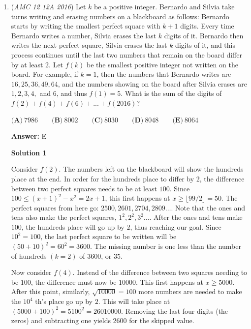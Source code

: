 \begin{enumerate}
 Since $a$ is positive so is R.

 This means that $r_1 = r_2 = r_3 = \sqrt{3}$

 From here you get find that $b=9$

 - AMBRIGGS

 


	\item (\textit{AMC 12 12A 2016}) Let $k$ be a positive integer. Bernardo and Silvia take turns writing and erasing numbers on a blackboard as follows: Bernardo starts by writing the smallest perfect square with $k+1$ digits. Every time Bernardo writes a number, Silvia erases the last $k$ digits of it. Bernardo then writes the next perfect square, Silvia erases the last $k$ digits of it, and this process continues until the last two numbers that remain on the board differ by at least 2. Let $f(k)$ be the smallest positive integer not written on the board. For example, if $k = 1$, then the numbers that Bernardo writes are $16, 25, 36, 49, 64$, and the numbers showing on the board after Silvia erases are $1, 2, 3, 4,$ and $6$, and thus $f(1) = 5$. What is the sum of the digits of $f(2) + f(4)+ f(6) + ... + f(2016)$?


 $\textbf{(A)}\ 7986\qquad\textbf{(B)}\ 8002\qquad\textbf{(C)}\ 8030\qquad\textbf{(D)}\ 8048\qquad\textbf{(E)}\ 8064$

 \textbf{Answer: }E



\textbf{Solution 1}

Consider $f(2)$. The numbers left on the blackboard will show the hundreds place at the end. In order for the hundreds place to differ by 2, the difference between two perfect squares needs to be at least $100$. Since $100\le (x+1)^2-x^2=2x+1$, this first happens at $x\ge \lfloor 99/2\rfloor = 50$. The perfect squares from here go: $2500,  2601, 2704, 2809\dots$. Note that the ones and tens also make the perfect squares, $1^2,2^2,3^2\dots$. After the ones and tens make $100$, the hundreds place will go up by $2$, thus reaching our goal. Since $10^2=100$, the last perfect square to be written will be $\left(50+10\right)^2=60^2=3600$. The missing number is one less than the number of hundreds $(k=2)$ of $3600$, or $35$.

 Now consider $f(4)$. Instead of the difference between two squares needing to be $100$, the difference must now be $10000$. This first happens at $x\ge 5000$. After this point, similarly, $\sqrt{10000}=100$ more numbers are needed to make the $10^4$ th's place go up by $2$. This will take place at $\left(5000+100\right)^2=5100^2= 26010000$. Removing the last four digits (the zeros) and subtracting one yields $2600$ for the skipped value.


\end{enumerate}

